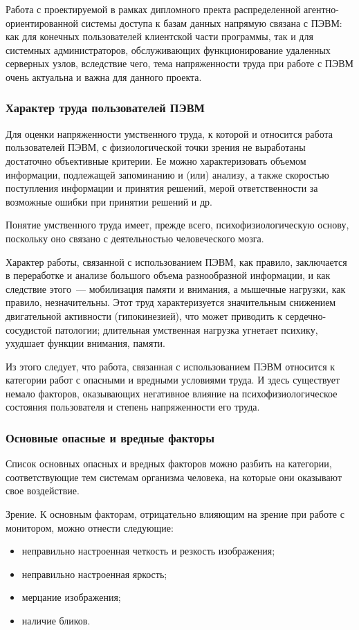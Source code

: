 Работа с проектируемой в рамках дипломного пректа распределенной агентно-ориентированной системы доступа к базам данных напрямую связана с  ПЭВМ: как для конечных пользователей клиентской части программы, так и для системных администраторов, обслуживающих функционирование удаленных серверных узлов, вследствие чего, тема напряженности труда при работе с ПЭВМ очень актуальна и важна для данного проекта.

\subsubsection{Характер труда пользователей ПЭВМ}
Для оценки напряженности умственного труда, к которой и относится работа пользователей ПЭВМ, с физиологической точки зрения не выработаны достаточно объективные критерии. Ее можно характеризовать объемом информации, подлежащей запоминанию и (или) анализу, а также скоростью поступления информации и принятия решений, мерой ответственности за возможные ошибки при принятии решений и др.

Понятие умственного труда имеет, прежде всего, психофизиологическую основу, поскольку оно связано с деятельностью человеческого мозга.

Характер работы, связанной с использованием ПЭВМ, как правило, заключается в переработке и анализе большого объема разнообразной информации, и как следствие этого~--- мобилизация памяти и внимания, а мышечные нагрузки, как правило, незначительны. Этот труд характеризуется значительным снижением двигательной активности (гипокинезией), что может приводить к сердечно-сосудистой патологии; длительная умственная нагрузка угнетает психику, ухудшает функции внимания, памяти.

Из этого следует, что работа, связанная с использованием ПЭВМ относится к категории работ с опасными и вредными условиями труда. И здесь существует немало факторов, оказывающих негативное влияние на психофизиологическое состояния пользователя и степень напряженности его труда.

\subsubsection{Основные опасные и вредные факторы}
Список основных опасных и вредных факторов можно разбить на категории, соответствующие тем системам организма человека, на которые они оказывают свое воздействие.

Зрение. К основным факторам, отрицательно влияющим на зрение при работе с монитором, можно отнести следующие:
\begin{itemize}
\item неправильно настроенная четкость и резкость изображения;
\item неправильно настроенная яркость;
\item мерцание изображения;
\item наличие бликов.
\end{itemize}

